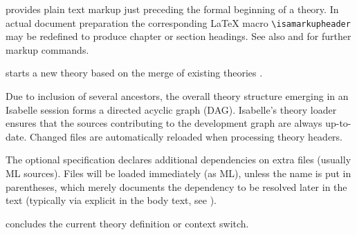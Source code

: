 \begin{isabellebody}
\begin{isamarkuptext}
\begin{descr}
  \item [\hyperlink{command.header}{\mbox{\isa{\isacommand{header}}}}~\isa{{\isachardoublequote}text{\isachardoublequote}}] provides plain text
  markup just preceding the formal beginning of a theory.  In actual
  document preparation the corresponding {\LaTeX} macro \verb|\isamarkupheader| may be redefined to produce chapter or section
  headings.  See also  and
   for further markup commands.
  
  \item [\hyperlink{command.theory}{\mbox{\isa{\isacommand{theory}}}}~\isa{{\isachardoublequote}A\ {\isasymIMPORTS}\ B\isactrlsub {\isadigit{1}}\ {\isasymdots}\ B\isactrlsub n\ {\isasymBEGIN}{\isachardoublequote}}] starts a new theory  based on the
  merge of existing theories .
  
  Due to inclusion of several ancestors, the overall theory structure
  emerging in an Isabelle session forms a directed acyclic graph
  (DAG).  Isabelle's theory loader ensures that the sources
  contributing to the development graph are always up-to-date.
  Changed files are automatically reloaded when processing theory
  headers.
  
  The optional \hypertarget{keyword.uses}{\hyperlink{keyword.uses}{\mbox{}}} specification declares additional
  dependencies on extra files (usually ML sources).  Files will be
  loaded immediately (as ML), unless the name is put in parentheses,
  which merely documents the dependency to be resolved later in the
  text (typically via explicit \hyperlink{command.use}{\mbox{}} in the body text,
  see ).
  
  \item [\hyperlink{command.end}{\mbox{\isa{\isacommand{end}}}}] concludes the current theory definition or
  context switch.

  \end{descr}%
\end{isamarkuptext}%
\isamarkuptrue%
%
\isadelimtheory
%
\endisadelimtheory
%
\isatagtheory
{}\isamarkupfalse%
%
\endisatagtheory
{\isafoldtheory}%
%
\isadelimtheory
%
\endisadelimtheory
\isanewline
\end{isabellebody}%
